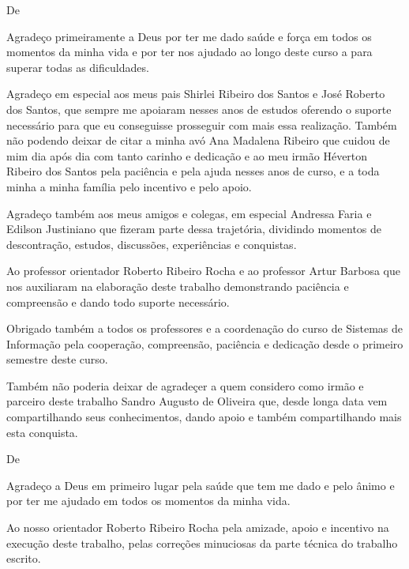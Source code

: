 \begin{agradecimentos}

De \imprimirAutorUm
\newline
\par Agradeço primeiramente a Deus por ter me dado saúde e força em todos os momentos
da minha vida e por ter nos ajudado ao longo deste curso a para superar todas as dificuldades.

\par Agradeço em especial aos meus pais Shirlei Ribeiro dos Santos
e José Roberto dos Santos, que sempre me apoiaram nesses anos
de estudos oferendo o suporte necessário para que eu conseguisse prosseguir com mais essa
realização. Também não podendo deixar de citar a minha avó Ana Madalena
Ribeiro que cuidou de mim dia após dia com tanto carinho e dedicação e ao meu
irmão Héverton Ribeiro dos Santos pela paciência e pela ajuda nesses anos de
curso, e a toda minha a minha família pelo incentivo e pelo apoio.

\par Agradeço também aos meus amigos e colegas, em especial Andressa Faria e
Edilson Justiniano que fizeram parte dessa trajetória, dividindo momentos de
descontração, estudos, discussões, experiências e conquistas.

\par Ao professor orientador Roberto Ribeiro Rocha e ao professor Artur Barbosa
que nos auxiliaram na elaboração deste trabalho demonstrando paciência e
compreensão e dando todo suporte necessário.

\par Obrigado também a todos os professores e a coordenação do curso de Sistemas de Informação 
pela cooperação, compreensão, paciência e dedicação desde o primeiro semestre deste
curso.

\par Também não poderia deixar de agradeçer a quem considero como irmão e
parceiro deste trabalho Sandro Augusto de Oliveira que, desde longa data vem
compartilhando seus conhecimentos, dando apoio e também compartilhando mais esta
conquista.

\vspace*{\fill}
De \imprimirAutorDois
\newline
\par Agradeço a Deus em primeiro lugar pela saúde que tem me dado e pelo ânimo e por
ter me ajudado em todos os momentos da minha vida.

\par Ao nosso orientador Roberto Ribeiro Rocha pela amizade, apoio e incentivo na execução 
deste trabalho, pelas correções minuciosas da parte técnica do trabalho escrito.


\end{agradecimentos}
